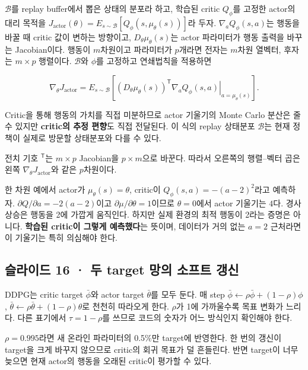 \documentclass[11pt,a4paper]{article}
\begin{document}
$\mathcal B$를 replay buffer에서 뽑은 상태의 분포라 하고, 학습된 critic $Q_\phi$를 고정한 actor의 대리 목적을 $J_{\mathrm{actor}}(\theta)=E_{s\sim\mathcal B}[Q_\phi(s,\mu_\theta(s))]$라 두자. $\nabla_aQ_\phi(s,a)$는 행동을 바꿀 때 critic 값이 변하는 방향이고, $D_\theta\mu_\theta(s)$는 actor 파라미터가 행동 출력을 바꾸는 Jacobian이다. 행동이 $m$차원이고 파라미터가 $p$개라면 전자는 $m$차원 열벡터, 후자는 $m\times p$ 행렬이다. $\mathcal B$와 $\phi$를 고정하고 연쇄법칙을 적용하면\par

\[
\nabla_\theta J_{\mathrm{actor}}
=E_{s\sim\mathcal B}\!\left[
(D_\theta\mu_\theta(s))^{\mathsf T}
\left.\nabla_a Q_\phi(s,a)\right|_{a=\mu_\theta(s)}
\right].
\]

Critic을 통해 행동의 가치를 직접 미분하므로 actor 기울기의 Monte Carlo 분산은 줄 수 있지만 \textbf{critic의 추정 편향}도 직접 전달된다. 이 식의 replay 상태분포 $\mathcal B$는 현재 정책이 실제로 방문할 상태분포와 다를 수 있다.\par

전치 기호 $^{\mathsf T}$는 $m\times p$ Jacobian을 $p\times m$으로 바꾼다. 따라서 오른쪽의 행렬–벡터 곱은 왼쪽 $\nabla_\theta J_{\mathrm{actor}}$와 같은 $p$차원이다.\par

한 차원 예에서 actor가 $\mu_\theta(s)=\theta$, critic이 $Q_\phi(s,a)=-(a-2)^2$라고 예측하자. $\partial Q/\partial a=-2(a-2)$이고 $\partial\mu/\partial\theta=1$이므로 $\theta=0$에서 actor 기울기는 $4$다. 경사 상승은 행동을 2에 가깝게 움직인다. 하지만 실제 환경의 최적 행동이 2라는 증명은 아니다. \textbf{학습된 critic이 그렇게 예측했다}는 뜻이며, 데이터가 거의 없는 $a=2$ 근처라면 이 기울기는 특히 의심해야 한다.\par

\subsection{슬라이드 16 · 두 target 망의 소프트 갱신}

DDPG는 critic target $\bar\phi$와 actor target $\bar\theta$를 모두 둔다. 매 step $\bar\phi\leftarrow\rho\bar\phi+(1-\rho)\phi$, $\bar\theta\leftarrow\rho\bar\theta+(1-\rho)\theta$로 천천히 따라오게 한다. $\rho$가 1에 가까울수록 목표 변화가 느리다. 다른 표기에서 $\tau=1-\rho$를 쓰므로 코드의 숫자가 어느 방식인지 확인해야 한다.\par

$\rho=0.995$라면 새 온라인 파라미터의 0.5\%만 target에 반영한다. 한 번의 갱신이 target을 크게 바꾸지 않으므로 critic의 회귀 목표가 덜 흔들린다. 반면 target이 너무 늦으면 현재 actor의 행동을 오래된 critic이 평가할 수 있다.\par
\end{document}
